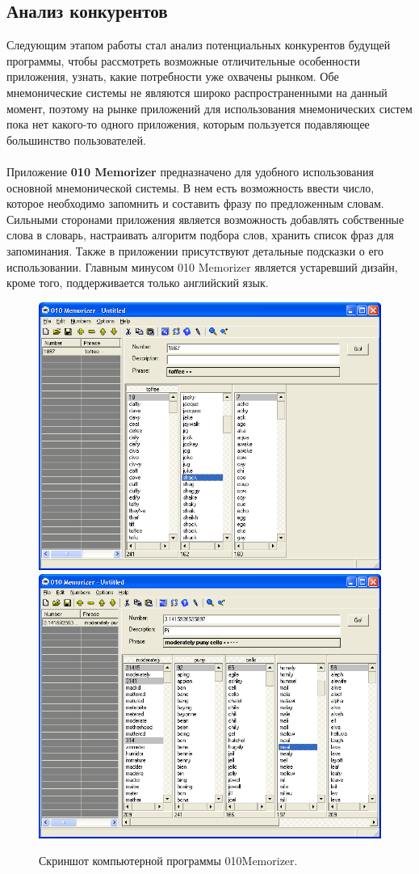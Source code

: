 \documentclass[draft]{article}
\begin{document}
\subsection{Анализ конкурентов}
Следующим этапом работы стал анализ потенциальных конкурентов будущей программы, чтобы рассмотреть возможные отличительные особенности приложения, узнать, какие потребности уже охвачены рынком. Обе мнемонические системы не являются широко распространенными на данный момент, поэтому на рынке приложений для использования мнемонических систем пока нет какого-то одного приложения, которым пользуется подавляющее большинство пользователей.\\
~\\
Приложение \textbf{010 Memorizer} \cite{litlink6} предназначено для удобного использования основной мнемонической системы. В нем есть возможность ввести число, которое необходимо запомнить и составить фразу по предложенным словам. Сильными сторонами приложения является возможность добавлять собственные слова в словарь, настраивать алгоритм подбора слов, хранить список фраз для запоминания. Также в приложении присутствуют детальные подсказки о его использовании. Главным минусом 010 Memorizer является устаревший дизайн, кроме того, поддерживается только английский язык.\\
\begin{center}
\begin{figure}[h]
\includegraphics[draft=false,width=0.5\linewidth]{010Memorizer1}
\includegraphics[draft=false,width=0.51\linewidth]{010Memorizer2}
\caption{Скриншот компьютерной программы 010Memorizer.}
\label{ris:image}
\end{figure}
\end{center}
\end{document}
